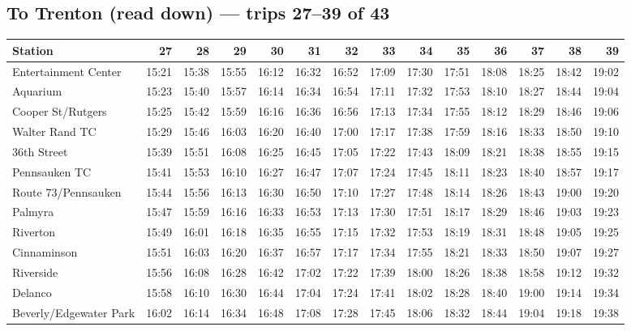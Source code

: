 \subsection*{To Trenton (read down) --- trips 27--39 of 43}
\begin{center}\footnotesize\setlength{\tabcolsep}{3pt}\begin{tabular}{@{}lrrrrrrrrrrrrr@{}}\toprule
Station & 27 & 28 & 29 & 30 & 31 & 32 & 33 & 34 & 35 & 36 & 37 & 38 & 39 \\\midrule
Entertainment Center & 15:21 & 15:38 & 15:55 & 16:12 & 16:32 & 16:52 & 17:09 & 17:30 & 17:51 & 18:08 & 18:25 & 18:42 & 19:02 \\
Aquarium & 15:23 & 15:40 & 15:57 & 16:14 & 16:34 & 16:54 & 17:11 & 17:32 & 17:53 & 18:10 & 18:27 & 18:44 & 19:04 \\
Cooper St/Rutgers & 15:25 & 15:42 & 15:59 & 16:16 & 16:36 & 16:56 & 17:13 & 17:34 & 17:55 & 18:12 & 18:29 & 18:46 & 19:06 \\
Walter Rand TC & 15:29 & 15:46 & 16:03 & 16:20 & 16:40 & 17:00 & 17:17 & 17:38 & 17:59 & 18:16 & 18:33 & 18:50 & 19:10 \\
36th Street & 15:39 & 15:51 & 16:08 & 16:25 & 16:45 & 17:05 & 17:22 & 17:43 & 18:09 & 18:21 & 18:38 & 18:55 & 19:15 \\
Pennsauken TC & 15:41 & 15:53 & 16:10 & 16:27 & 16:47 & 17:07 & 17:24 & 17:45 & 18:11 & 18:23 & 18:40 & 18:57 & 19:17 \\
Route 73/Pennsauken & 15:44 & 15:56 & 16:13 & 16:30 & 16:50 & 17:10 & 17:27 & 17:48 & 18:14 & 18:26 & 18:43 & 19:00 & 19:20 \\
Palmyra & 15:47 & 15:59 & 16:16 & 16:33 & 16:53 & 17:13 & 17:30 & 17:51 & 18:17 & 18:29 & 18:46 & 19:03 & 19:23 \\
Riverton & 15:49 & 16:01 & 16:18 & 16:35 & 16:55 & 17:15 & 17:32 & 17:53 & 18:19 & 18:31 & 18:48 & 19:05 & 19:25 \\
Cinnaminson & 15:51 & 16:03 & 16:20 & 16:37 & 16:57 & 17:17 & 17:34 & 17:55 & 18:21 & 18:33 & 18:50 & 19:07 & 19:27 \\
Riverside & 15:56 & 16:08 & 16:28 & 16:42 & 17:02 & 17:22 & 17:39 & 18:00 & 18:26 & 18:38 & 18:58 & 19:12 & 19:32 \\
Delanco & 15:58 & 16:10 & 16:30 & 16:44 & 17:04 & 17:24 & 17:41 & 18:02 & 18:28 & 18:40 & 19:00 & 19:14 & 19:34 \\
Beverly/Edgewater Park & 16:02 & 16:14 & 16:34 & 16:48 & 17:08 & 17:28 & 17:45 & 18:06 & 18:32 & 18:44 & 19:04 & 19:18 & 19:38 \\

\end{tabular}
\end{center}

